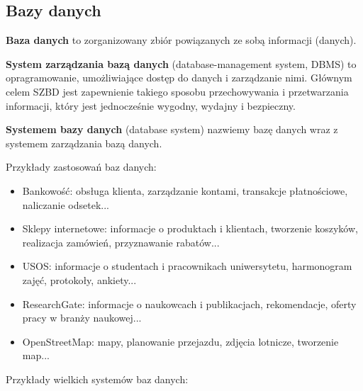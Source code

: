 \subsection{Bazy danych}

\begin{definition}
    \textbf{Baza danych} to zorganizowany zbiór powiązanych ze sobą informacji (danych).
\end{definition}

\begin{definition}
    \textbf{System zarządzania bazą danych} (database-management system, DBMS) to opragramowanie,
    umożliwiające dostęp do danych i zarządzanie nimi. Głównym celem SZBD jest zapewnienie takiego sposobu
    przechowywania i przetwarzania informacji, który jest jednocześnie wygodny, wydajny i bezpieczny.
\end{definition}

\begin{definition}
    \textbf{Systemem bazy danych} (database system) nazwiemy bazę danych wraz z systemem zarządzania bazą danych.
\end{definition}

Przykłady zastosowań baz danych:

\begin{itemize}
    \item Bankowość: obsługa klienta, zarządzanie kontami, transakcje płatnościowe, naliczanie odsetek...
    \item Sklepy internetowe: informacje o produktach i klientach, tworzenie koszyków, realizacja zamówień, przyznawanie rabatów...
    \item USOS: informacje o studentach i pracownikach uniwersytetu, harmonogram zajęć, protokoły, ankiety...
    \item ResearchGate: informacje o naukowcach i publikacjach, rekomendacje, oferty pracy w branży naukowej...
    \item OpenStreetMap: mapy, planowanie przejazdu, zdjęcia lotnicze, tworzenie map...
\end{itemize}

Przykłady wielkich systemów baz danych:

